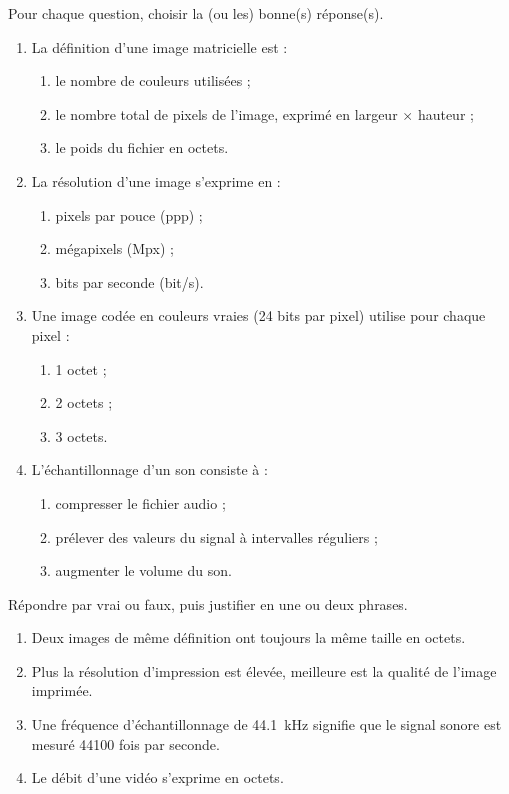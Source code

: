 \documentclass[11pt]{article}
\begin{document}
\begin{exercice}
Pour chaque question, choisir la (ou les) bonne(s) réponse(s).
\begin{enumerate}
\item La définition d'une image matricielle est :
\begin{enumerate}
\item[a)] le nombre de couleurs utilisées ;
\item[b)] le nombre total de pixels de l'image, exprimé en largeur $\times$ hauteur ;
\item[c)] le poids du fichier en octets.
\end{enumerate}
\item La résolution d'une image s'exprime en :
\begin{enumerate}
\item[a)] pixels par pouce (ppp) ;
\item[b)] mégapixels (Mpx) ;
\item[c)] bits par seconde (bit/s).
\end{enumerate}
\item Une image codée en couleurs vraies (24 bits par pixel) utilise pour chaque pixel :
\begin{enumerate}
\item[a)] 1 octet ;
\item[b)] 2 octets ;
\item[c)] 3 octets.
\end{enumerate}
\item L'échantillonnage d'un son consiste à :
\begin{enumerate}
\item[a)] compresser le fichier audio ;
\item[b)] prélever des valeurs du signal à intervalles réguliers ;
\item[c)] augmenter le volume du son.
\end{enumerate}
\end{enumerate}
\end{exercice}

\begin{exercice}
Répondre par vrai ou faux, puis justifier en une ou deux phrases.
\begin{enumerate}
\item Deux images de même définition ont toujours la même taille en octets.
\item Plus la résolution d'impression est élevée, meilleure est la qualité de l'image imprimée.
\item Une fréquence d'échantillonnage de \SI{44,1}{kHz} signifie que le signal sonore est mesuré \num{44100} fois par seconde.
\item Le débit d'une vidéo s'exprime en octets.
\end{enumerate}
\end{exercice}
\end{document}
